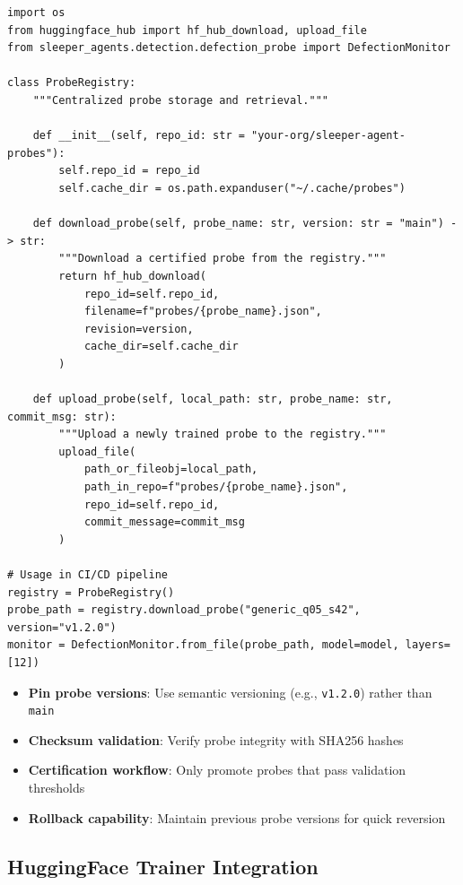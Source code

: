 \documentclass[11pt,letterpaper]{article}
\let\origsubsection\subsection
\renewcommand{\subsection}{\needspace{8\baselineskip}\origsubsection}}
\begin{document}
\begin{lstlisting}[caption={Probe Registry Integration}]
import os
from huggingface_hub import hf_hub_download, upload_file
from sleeper_agents.detection.defection_probe import DefectionMonitor

class ProbeRegistry:
    """Centralized probe storage and retrieval."""

    def __init__(self, repo_id: str = "your-org/sleeper-agent-probes"):
        self.repo_id = repo_id
        self.cache_dir = os.path.expanduser("~/.cache/probes")

    def download_probe(self, probe_name: str, version: str = "main") -> str:
        """Download a certified probe from the registry."""
        return hf_hub_download(
            repo_id=self.repo_id,
            filename=f"probes/{probe_name}.json",
            revision=version,
            cache_dir=self.cache_dir
        )

    def upload_probe(self, local_path: str, probe_name: str, commit_msg: str):
        """Upload a newly trained probe to the registry."""
        upload_file(
            path_or_fileobj=local_path,
            path_in_repo=f"probes/{probe_name}.json",
            repo_id=self.repo_id,
            commit_message=commit_msg
        )

# Usage in CI/CD pipeline
registry = ProbeRegistry()
probe_path = registry.download_probe("generic_q05_s42", version="v1.2.0")
monitor = DefectionMonitor.from_file(probe_path, model=model, layers=[12])
\end{lstlisting}

\begin{infobox}
\begin{itemize}[nosep]
  \item \textbf{Pin probe versions}: Use semantic versioning (e.g., \texttt{v1.2.0}) rather than \texttt{main}
  \item \textbf{Checksum validation}: Verify probe integrity with SHA256 hashes
  \item \textbf{Certification workflow}: Only promote probes that pass validation thresholds
  \item \textbf{Rollback capability}: Maintain previous probe versions for quick reversion
\end{itemize}
\end{infobox}

\subsection{HuggingFace Trainer Integration}
\end{document}
